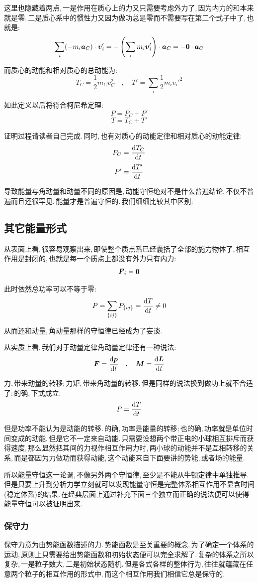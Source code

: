 这里也隐藏着两点,\,一是作用在质心上的力又只需要考虑外力了,\,因为内力的和本来就是零.\,二是质心系中的惯性力又因为做功总是零而不需要写在第二个式子中了,\,也就是:
\[\sum_i (-m_i\boldsymbol{a}_C)\cdot \boldsymbol{v}_i'=-\left(\sum_im_i \boldsymbol{v}_i'\right)\cdot\boldsymbol{a}_C=-\boldsymbol{0}\cdot\boldsymbol{a}_C\]

而质心的动能和相对质心的总动能为:
\[T_C=\frac{1}{2}m_Cv_C^2\quad,\quad T'=\sum_i\frac{1}{2}m_iv_i'^2\]

如此定义以后将符合柯尼希定理:
\[P=P_C+P'\]
\[T=T_C+T'\]

证明过程请读者自己完成.\,同时,\,也有对质心的动能定律和相对质心的动能定律:
\[P_C=\frac{\textrm{d} T_C}{\textrm{d} t}\]
\[P'=\frac{\textrm{d} T'}{\textrm{d} t}\]

导致能量与角动量和动量不同的原因是,\,动能守恒绝对不是什么普遍结论,\,不仅不普遍而且还很罕见.\,能量才是普遍守恒的.\,我们细细比较其中区别:


\subsection{其它能量形式}

从表面上看,\,很容易观察出来,\,即使整个质点系已经囊括了全部的施力物体了,\,相互作用是封闭的,\,也就是每一个质点上都没有外力只有内力:
\[\boldsymbol{F}_i=\boldsymbol{0}\]

此时依然总功率可以不等于零:
\[P=\sum_{\{ij\}}P_{\{ij\}}=\frac{\textrm{d} T}{\textrm{d} t}\neq 0\]

从而还和动量,\,角动量那样的守恒律已经成为了妄谈.

从实质上看,\,我们对于动量定律角动量定律还有一种说法:
\[\boldsymbol{F}=\frac{\textrm{d} \boldsymbol{p}}{\textrm{d} t}\quad,\quad \boldsymbol{M}=\frac{\textrm{d} \boldsymbol{L}}{\textrm{d} t}\]

力,\,带来动量的转移;\,力矩,\,带来角动量的转移.\,但是同样的说法换到做功上就不合适了:\,的确,\,下式成立:
\[P=\frac{\textrm{d} T}{\textrm{d} t}\]

但是功率不能认为是动能的转移.\,的确,\,功率是能量的转移;\,也的确,\,功率就是单位时间变成的动能.\,但是它不一定来自动能.\,只需要设想两个带正电的小球相互排斥而获得速度,\,那么显然把其间的力视作相互作用力时,\,两小球的动能并不是互相转移的关系,\,而是都因为力做功而获得动能,\,这个动能来自下面要讲的势能,\,或者场的能量.

所以能量守恒这一论调,\,不像另外两个守恒律,\,至少是不能从牛顿定律中单独推导.\,但是只要上升到分析力学立刻就可以发现能量守恒是完整体系相互作用不显含时间(稳定体系)的结果.\,在经典层面上通过补充下面三个独立而正确的说法便可以使得能量守恒可以被证明出来.

\subsubsection{保守力}
保守力意为由势能函数描述的力.\,势能函数是至关重要的概念,\,为了确定一个体系的运动,\,原则上只需要给出势能函数和初始状态便可以完全求解了.\,复杂的体系之所以复杂,\,一是粒子数大,\,二是初始状态随机.\,但是各式各样的整体行为,\,往往就蕴藏在任意两个粒子的相互作用的形式中.\,而这个相互作用我们相信它总是保守的.

